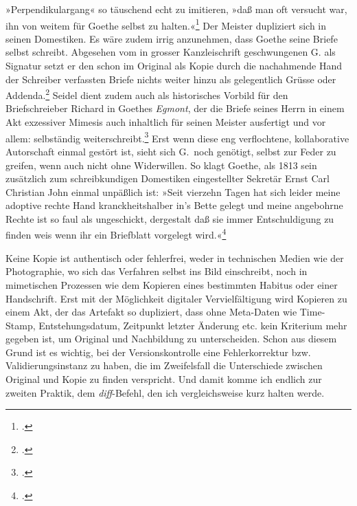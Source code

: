 \documentclass[a4paper,11pt]{article}
\newcommand{\anf}[1]{»#1«}
\begin{document}
\anf{Perpendikulargang} so täuschend echt zu imitieren, \anf{daß man oft versucht war, ihn von weitem für Goethe selbst zu halten.}\footcite[S.~47]{lyncker:1912} Der Meister dupliziert sich in seinen Domestiken. Es wäre zudem irrig anzunehmen, dass Goethe seine Briefe selbst schreibt. Abgesehen vom in grosser Kanzleischrift geschwungenen G. als Signatur setzt er den schon im Original als Kopie durch die nachahmende Hand der Schreiber verfassten Briefe nichts weiter hinzu als gelegentlich Grüsse oder Addenda.\footcite[40]{schleif:1965} Seidel dient zudem auch als historisches Vorbild für den Briefschreieber Richard in Goethes \emph{Egmont}, der die Briefe seines Herrn in einem Akt exzessiver Mimesis auch inhaltlich für seinen Meister ausfertigt und vor allem: selbständig weiterschreibt.\footcite[Vgl.][253–256]{krajewski:2010} Erst wenn diese eng verflochtene, kollaborative Autorschaft einmal gestört ist, sieht sich G.\ noch genötigt, selbst zur Feder zu greifen, wenn auch nicht ohne Widerwillen. So klagt Goethe, als 1813 sein zusätzlich zum schreibkundigen Domestiken eingestellter Sekretär Ernst Carl Christian John einmal unpäßlich ist: \anf{Seit vierzehn Tagen hat sich leider meine adoptive rechte Hand kranckheitshalber in's Bette gelegt und meine angebohrne Rechte ist so faul als ungeschickt, dergestalt daß sie immer Entschuldigung zu finden weis wenn ihr ein Briefblatt\index{Brief} vorgelegt wird.}\footcite[][Nachträge: Briefe, Bd.~51, S.~342]{goethe:1887}


Keine Kopie ist authentisch oder fehlerfrei, weder in technischen Medien wie der Photographie, wo sich das Verfahren selbst ins Bild einschreibt, noch in mimetischen Prozessen wie dem Kopieren eines bestimmten Habitus oder einer Handschrift. Erst mit der Möglichkeit digitaler Vervielfältigung wird Kopieren zu einem Akt, der das Artefakt so dupliziert, dass ohne Meta-Daten wie Time-Stamp, Entstehungsdatum, Zeitpunkt letzter Änderung etc. kein Kriterium mehr gegeben ist, um Original und Nachbildung zu unterscheiden. Schon aus diesem Grund ist es wichtig, bei der Versionskontrolle eine Fehlerkorrektur bzw. Validierungsinstanz zu haben, die im Zweifelsfall die Unterschiede zwischen Original und Kopie zu finden verspricht. Und damit komme ich endlich zur zweiten Praktik, dem \emph{diff}-Befehl, den ich vergleichsweise kurz halten werde.
\end{document}
